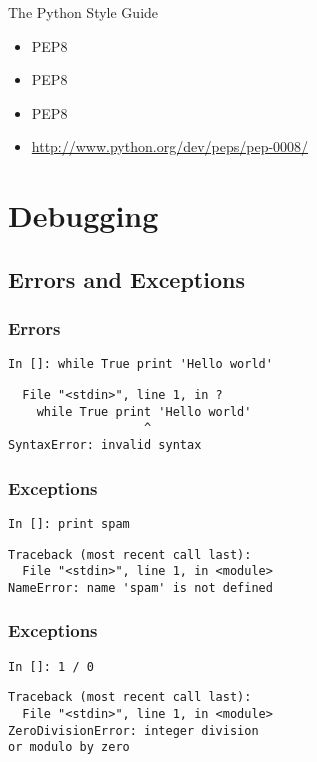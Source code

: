 \documentclass[compress,14pt]{beamer}
\begin{document}
\begin{frame}{The Python Style Guide}
  \begin{itemize}
   \item PEP8
   \item PEP8
   \item PEP8
   \item \url{http://www.python.org/dev/peps/pep-0008/}
   \end{itemize}
\end{frame}

\section{Debugging}
\subsection{Errors and Exceptions}
\begin{frame}[fragile]
 \frametitle{Errors}
 \begin{lstlisting}
In []: while True print 'Hello world'
 \end{lstlisting}
\pause
  \begin{lstlisting}
  File "<stdin>", line 1, in ?
    while True print 'Hello world'
                   ^
SyntaxError: invalid syntax
\end{lstlisting}
\end{frame}

\begin{frame}[fragile]
 \frametitle{Exceptions}
 \begin{lstlisting}
In []: print spam
\end{lstlisting}
\pause
\begin{lstlisting}
Traceback (most recent call last):
  File "<stdin>", line 1, in <module>
NameError: name 'spam' is not defined
\end{lstlisting}
\end{frame}

\begin{frame}[fragile]
 \frametitle{Exceptions}
 \begin{lstlisting}
In []: 1 / 0
\end{lstlisting}
\pause
\begin{lstlisting}
Traceback (most recent call last):
  File "<stdin>", line 1, in <module>
ZeroDivisionError: integer division 
or modulo by zero
\end{lstlisting}
\end{frame}
\end{document}
